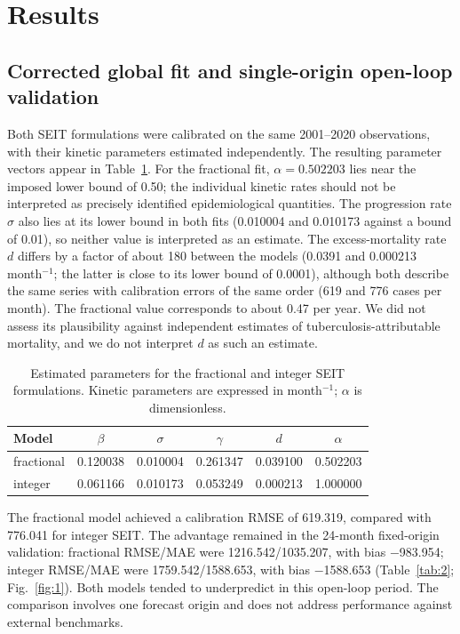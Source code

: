 \documentclass[pdflatex,sn-mathphys-ay]{sn-jnl}
\begin{document}
\section{Results}

\subsection{Corrected global fit and single-origin open-loop validation}

Both SEIT formulations were calibrated on the same 2001--2020 observations, with their kinetic parameters estimated independently. The resulting parameter vectors appear in Table~\ref{tab:1}. For the fractional fit, $\alpha=0.502203$ lies near the imposed lower bound of 0.50; the individual kinetic rates should not be interpreted as precisely identified epidemiological quantities. The progression rate $\sigma$ also lies at its lower bound in both fits (0.010004 and 0.010173 against a bound of 0.01), so neither value is interpreted as an estimate. The excess-mortality rate $d$ differs by a factor of about 180 between the models (0.0391 and 0.000213 month$^{-1}$; the latter is close to its lower bound of 0.0001), although both describe the same series with calibration errors of the same order (619 and 776 cases per month). The fractional value corresponds to about 0.47 per year. We did not assess its plausibility against independent estimates of tuberculosis-attributable mortality, and we do not interpret $d$ as such an estimate.

\begin{table}[htbp]
\centering
\small
\caption{Estimated parameters for the fractional and integer SEIT formulations. Kinetic parameters are expressed in month$^{-1}$; $\alpha$ is dimensionless.}
\label{tab:1}
\begin{tabular}{@{}lccccc@{}}
\toprule
Model & $\beta$ & $\sigma$ & $\gamma$ & $d$ & $\alpha$ \\
\midrule
fractional & 0.120038 & 0.010004 & 0.261347 & 0.039100 & 0.502203 \\
integer & 0.061166 & 0.010173 & 0.053249 & 0.000213 & 1.000000 \\
\bottomrule
\end{tabular}
\end{table}

The fractional model achieved a calibration RMSE of 619.319, compared with 776.041 for integer SEIT. The advantage remained in the 24-month fixed-origin validation: fractional RMSE/MAE were 1216.542/1035.207, with bias $-$983.954; integer RMSE/MAE were 1759.542/1588.653, with bias $-$1588.653 (Table~\ref{tab:2}; Fig.~\ref{fig:1}). Both models tended to underpredict in this open-loop period. The comparison involves one forecast origin and does not address performance against external benchmarks.
\end{document}
